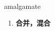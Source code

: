 
\begin{frame}
{\huge amalgamate}
\begin{center}
\begin{enumerate}\Large
  \item \textbf{合并，混合}
\end{enumerate}
\end{center}
\end{frame}
